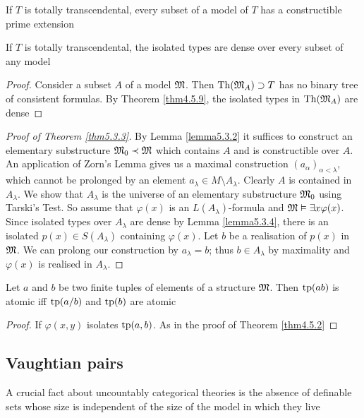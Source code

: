 \documentclass[11pt]{article}
\begin{document}
\begin{theorem}[]
\label{thm5.3.3}
If \(T\) is totally transcendental, every subset of a model of \(T\) has a constructible prime extension
\end{theorem}


\begin{lemma}[]
\label{lemma5.3.4}
If \(T\) is totally transcendental, the isolated types are dense over every subset of any model
\end{lemma}

\begin{proof}
Consider a subset \(A\) of a model \(\mathfrak{M}\). Then \(\operatorname{Th}(\mathfrak{M}_A)\supset T\) has no binary tree of consistent
formulas. By Theorem \ref{thm4.5.9}, the isolated types in \(\operatorname{Th}(\mathfrak{M}_A)\) are dense
\end{proof}

\begin{proof}[Proof of Theorem \ref{thm5.3.3}]
By Lemma \ref{lemma5.3.2} it suffices to construct an elementary substructure \(\mathfrak{M}_0\prec\mathfrak{M}\) which
contains \(A\) and is constructible over \(A\). An application of Zorn's Lemma gives us a
maximal construction \((a_\alpha)_{\alpha<\lambda}\), which cannot be prolonged by an element \(a_\lambda\in M\setminus A_\lambda\).
Clearly \(A\) is contained in \(A_\lambda\). We show that \(A_\lambda\) is the universe of an elementary
substructure \(\mathfrak{M}_0\) using Tarski's Test. So assume that \(\varphi(x)\) is an \(L(A_\lambda)\)-formula
and \(\mathfrak{M}\vDash\exists x\varphi(x)\). Since isolated types over \(A_\lambda\) are dense by Lemma \ref{lemma5.3.4}, there is
an isolated \(p(x)\in S(A_\lambda)\) containing \(\varphi(x)\). Let \(b\) be a realisation of \(p(x)\)
in \(\mathfrak{M}\). We can prolong our construction by \(a_\lambda=b\); thus \(b\in A_\lambda\) by maximality
and \(\varphi(x)\) is realised in \(A_\lambda\).
\end{proof}

\begin{lemma}[]
\label{lemma5.3.5}
Let \(a\) and \(b\) be two finite tuples of elements of a structure \(\mathfrak{M}\). Then \(\operatorname{tp}(ab)\) is
atomic iff \(\operatorname{tp}(a/b)\) and \(\operatorname{tp}(b)\) are atomic
\end{lemma}

\begin{proof}
If \(\varphi(x,y)\) isolates \(\operatorname{tp}(a,b)\). As in the proof of Theorem \ref{thm4.5.2}
\end{proof}

\subsection{Vaughtian pairs}
\label{sec:orgdaa0869}
A crucial fact about uncountably categorical theories is the absence of definable sets whose
size is independent of the size of the model in which they live
\end{document}
